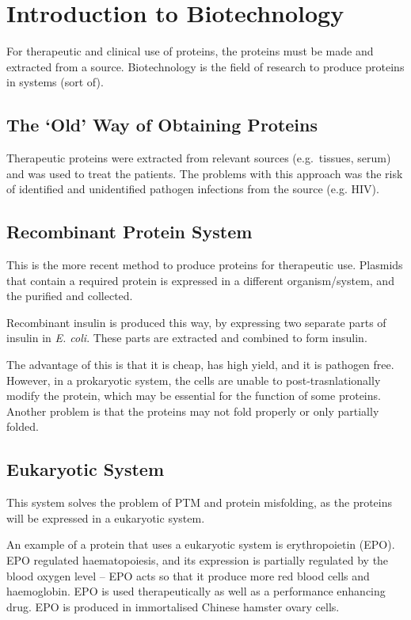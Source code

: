 \section{Introduction to Biotechnology}

For therapeutic and clinical use of proteins, the proteins must be made and extracted from a source.
Biotechnology is the field of research to produce proteins in systems (sort of).

\subsection{The `Old' Way of Obtaining Proteins}

Therapeutic proteins were extracted from relevant sources (e.g.\ tissues, serum) and was used to treat the patients.
The problems with this approach was the risk of identified and unidentified pathogen infections from the source (e.g. HIV).

\subsection{Recombinant Protein System}

This is the more recent method to produce proteins for therapeutic use.
Plasmids that contain a required protein is expressed in a different organism/system, and the purified and collected.

Recombinant insulin is produced this way, by expressing two separate parts of insulin in \textit{E. coli}.
These parts are extracted and combined to form insulin.

The advantage of this is that it is cheap, has high yield, and it is pathogen free.
However, in a prokaryotic system, the cells are unable to post-trasnlationally modify the protein, which may be essential for the function of some proteins.
Another problem is that the proteins may not fold properly or only partially folded.

\subsection{Eukaryotic System}

This system solves the problem of PTM and protein misfolding, as the proteins will be expressed in a eukaryotic system.

An example of a protein that uses a eukaryotic system is erythropoietin (EPO).
EPO regulated haematopoiesis, and its expression is partially regulated by the blood oxygen level -- EPO acts so that it produce more red blood cells and haemoglobin.
EPO is used therapeutically as well as a performance enhancing drug.
EPO is produced in immortalised Chinese hamster ovary cells.


